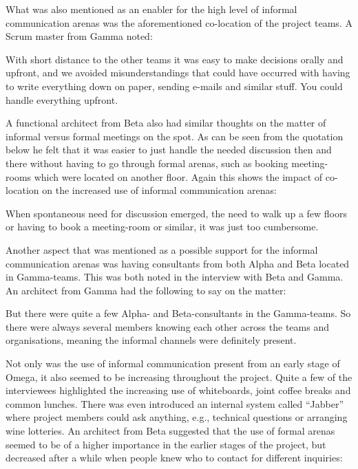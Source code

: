 What was also mentioned as an enabler for the high level of informal communication arenas was the aforementioned co-location of the project teams. A Scrum master from Gamma noted:

\begin{fancyquotes}
With short distance to the other teams it was easy to make decisions orally and upfront, and we avoided misunderstandings that could have occurred with having to write everything down on paper, sending e-mails and similar stuff. You could handle everything upfront.
\end{fancyquotes}

A functional architect from Beta also had similar thoughts on the matter of informal versus formal meetings on the spot. As can be seen from the quotation below he felt that it was easier to just handle the needed discussion then and there without having to go through formal arenas, such as booking meeting-rooms which were located on another floor. Again this shows the impact of co-location on the increased use of informal communication arenas:

\begin{fancyquotes}
When spontaneous need for discussion emerged, the need to walk up a few floors or having to book a meeting-room or similar, it was just too cumbersome.
\end{fancyquotes}

Another aspect that was mentioned as a possible support for the informal communication arenas was having consultants from both Alpha and Beta located in Gamma-teams. This was both noted in the interview with Beta and Gamma. An architect from Gamma had the following to say on the matter:

\begin{fancyquotes}
But there were quite a few Alpha- and Beta-consultants in the Gamma-teams. So there were always several members knowing each other across the teams and organisations, meaning the informal channels were definitely present.
\end{fancyquotes}

Not only was the use of informal communication present from an early stage of Omega, it also seemed to be increasing throughout the project. Quite a few of the interviewees highlighted the increasing use of whiteboards, joint coffee breaks and common lunches. There was even introduced an internal system called ``Jabber'' where project members could ask anything, e.g., technical questions or arranging wine lotteries. An architect from Beta suggested that the use of formal arenas seemed to be of a higher importance in the earlier stages of the project, but decreased after a while when people knew who to contact for different inquiries:

